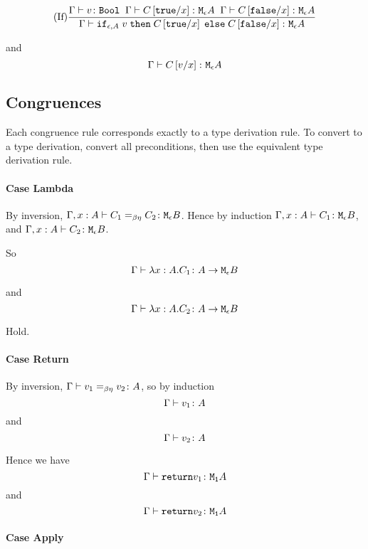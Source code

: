 {        \begin{equation}
            \treerule{If}{
                \gtyperelation{v}{\B}
                \s\s
                \gtyperelation{C\ssub{x}{\t}}{\mea}
                \s\s
                \gtyperelation{C\ssub{x}{\f}}{\mea}
            }{\gtyperelation{\ifthenelse{\e}{A}{v}{C\ssub{x}{\t}}{C\ssub{x}{\f}}}{\mea}
            }
        \end{equation}

        and 
        \begin{equation}
            \gtyperelation{C\ssub{x}{v}}{\mea}
        \end{equation}


        \subsection{Congruences}
    Each congruence rule corresponds exactly to a type derivation rule. To convert to a type derivation, convert all preconditions, then use the equivalent type derivation rule.

    \paragraph{Case Lambda}
        By inversion, $\berelation{\gax}{C_1}{C_2}{\meb}$. Hence by induction $\typerelation{\gax}{C_1}{\meb}$, and $\typerelation{\gax}{C_2}{\meb}$.

        So 
        \begin{equation}
            \gtyperelation{\lam{x}{A}{C_1}}{\aeb}
        \end{equation}

        and
        \begin{equation}
            \gtyperelation{\lam{x}{A}{C_2}}{\aeb}
        \end{equation}

        Hold.
    \paragraph{Case Return}
        By inversion, $\gberelation{v_1}{v_2}{A}$, so by induction $$\gtyperelation{v_1}{A}$$ and $$\gtyperelation{v_2}{A}$$

        Hence we have $$\gtyperelation{\return{v_1}}{\moa}$$
        and
        $$\gtyperelation{\return{v_2}}{\moa}$$
    \paragraph{Case Apply}

}
